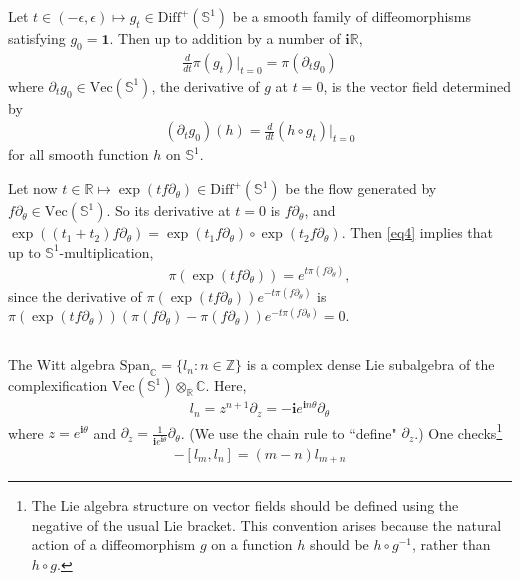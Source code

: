 \documentclass[11pt,b5paper,notitlepage]{article}
\theoremstyle{definition}
\theoremstyle{plain}
\newcommand{\id}{\mathbf{1}}
\newcommand{\Diffp}{\mathrm{Diff}^+}
\newcommand{\Span}{\mathrm{Span}}
\newcommand{\Vect}{\mathrm{Vec}}
\newcommand{\im}{\mathbf{i}}
\newcommand{\Cbb}{\mathbb C}
\newcommand{\Zbb}{\mathbb Z}
\newcommand{\Rbb}{\mathbb R}
\newcommand{\Sbb}{{\mathbb S}}
\numberwithin{equation}{section}
\begin{document}
Let $t\in(-\epsilon,\epsilon)\mapsto g_t\in\Diffp(\Sbb^1)$ be a smooth family of diffeomorphisms satisfying $g_0=\id$. Then up to addition by a number of $\im\Rbb$, 
\begin{align}
\frac d{dt}\pi(g_t)\Big|_{t=0}=\pi(\partial_t g_0)	\label{eq5}
\end{align}
where $\partial_t g_0\in\Vect(\Sbb^1)$, the derivative of $g$ at $t=0$, is the vector field determined by
\begin{align}
(\partial_t g_0)(h)=\frac d{dt}(h\circ g_t)\Big|_{t=0}\label{eq4}
\end{align}
for all smooth function $h$ on $\Sbb^1$.


Let now $t\in\Rbb\mapsto\exp(tf\partial_\theta)\in\Diffp(\Sbb^1)$ be the flow generated by $f\partial_\theta\in\Vect(\Sbb^1)$. So its derivative at $t=0$ is $f\partial_\theta$, and $\exp((t_1+t_2)f\partial_\theta)=\exp(t_1f\partial_\theta)\circ\exp(t_2 f\partial_\theta)$. Then \eqref{eq4} implies that up to $\Sbb^1$-multiplication,
\begin{align}
\pi(\exp(tf\partial_\theta))=e^{t\pi(f\partial_\theta)},\label{eq6}
\end{align}
since the derivative of $\pi(\exp(tf\partial_\theta))e^{-t\pi(f\partial_\theta)}$ is $\pi(\exp(tf\partial_\theta))(\pi(f\partial_\theta)-\pi(f\partial_\theta))e^{-t\pi(f\partial_\theta)}=0$.



\subsection{}

The Witt algebra $\Span_\Cbb=\{l_n:n\in\Zbb\}$ is a complex dense Lie subalgebra of the complexification $\Vect(\Sbb^1)\otimes_\Rbb\Cbb$. Here,
\begin{align}
l_n=z^{n+1}\partial_z=-\im e^{\im n\theta}\partial_\theta	
\end{align}
where $z=e^{\im\theta}$ and $\partial_z=\frac 1{\im e^{\im\theta}}\partial_\theta$. (We use the chain rule to ``define" $\partial_z$.) One checks\footnote{The Lie algebra structure on vector fields should be defined using the negative of the usual Lie bracket. This convention arises because the natural action of a diffeomorphism $g$ on a function $h$ should be $h\circ g^{-1}$, rather than $h\circ g$.}
\begin{align}
-[l_m,l_n]=(m-n)l_{m+n}
\end{align}
\end{document}
